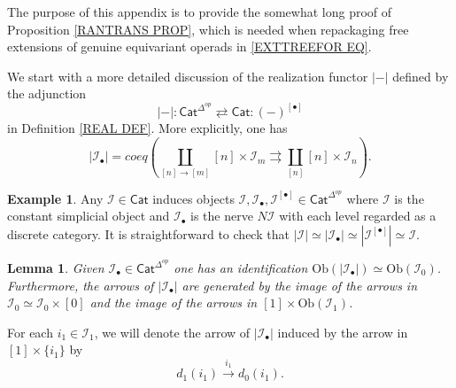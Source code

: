 \documentclass[a4paper,10pt
,draft
]{article}%
\numberwithin{equation}{section}
\numberwithin{figure}{section}
\newtheorem{lemma}[equation]{Lemma}%
\theoremstyle{definition} %
\newtheorem{example}[equation]{Example}%
\newcommand{\1}{\ensuremath{\mathbbm 1}}%
\begin{document}
The purpose of this appendix is to provide the
somewhat long proof of Proposition \ref{RANTRANS PROP}, 
which is needed when repackaging free extensions of
genuine equivariant operads in \eqref{EXTTREEFOR EQ}.


We start with a more detailed discussion of the realization functor $|\minus|$
defined by the adjunction
	\[
	|\minus|\colon
	\mathsf{Cat}^{\Delta^{op}} 
		\rightleftarrows
	\mathsf{Cat} 
	\colon (\minus)^{[\bullet]}
	\]
in Definition \ref{REAL DEF}.
More explicitly, one has
\begin{equation}\label{REALDEF EQ}
	 |\mathcal{I}_{\bullet}| =
	coeq \left(\coprod_{[n] \to [m]}
	 [n] \times \mathcal{I}_m
	 	\rightrightarrows
	 \coprod_{[n]} [n] \times \mathcal{I}_n
	 \right).
\end{equation}

\begin{example}
Any $\mathcal{I} \in \mathsf{Cat}$ induces objects 
$\mathcal{I},\mathcal{I}_{\bullet},\mathcal{I}^{[\bullet]} \in \mathsf{Cat}^{\Delta^{op}}$ 
where $\mathcal{I}$ is the constant simplicial object and $\mathcal{I}_{\bullet}$ is the nerve $N \mathcal{I}$ with each level regarded as a discrete category.
It is straightforward to check that 
$|\mathcal{I}|\simeq |\mathcal{I}_{\bullet}| \simeq
|\mathcal{I}^{[\bullet]}| \simeq \mathcal{I}$.
\end{example}


\begin{lemma}\label{OBJGENREL LEMMA}
	Given $\mathcal{I}_{\bullet} \in \mathsf{Cat}^{\Delta^{op}}$ one has an identification
	$\text{Ob}(|\mathcal{I}_{\bullet}|) \simeq \text{Ob}(\mathcal{I}_0)$.
	Furthermore, the arrows of $|\mathcal{I}_{\bullet}|$ are generated by the image of the arrows in $\mathcal{I}_0 \simeq \mathcal{I}_0 \times [0]$ and the image of the arrows in 
	$[1] \times \text{Ob}(\mathcal{I}_1)$.
\end{lemma}

For each $i_1 \in \mathcal{I}_1$, we will denote the arrow of 
$|\mathcal{I}_{\bullet}|$ induced by the arrow in $[1] \times \{i_1\}$ by
\[d_1(i_1) \xrightarrow{i_1} d_0(i_1).\]
\end{document}
